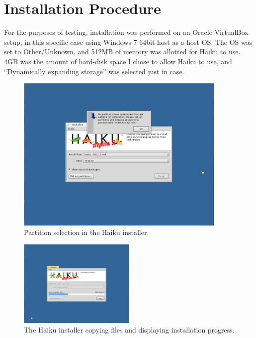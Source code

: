 \documentclass{article}
\begin{document}
\section{Installation Procedure}

For the purposes of testing, installation was performed on an Oracle
VirtualBox setup, in this specific case using Windows 7 64bit host as
a host OS.  The OS was set to Other/Unknown, and 512MB of memory was
allotted for Haiku to use. 4GB was the amount of hard-disk space I
chose to allow Haiku to use, and ``Dynamically expanding storage'' was
selected just in case.

\begin{figure}[h]
\centering
\includegraphics[width=0.9\textwidth]{figs/install-partition.png}
\caption{Partition selection in the Haiku installer.}
\label{fig:install-partition}
\end{figure}

\begin{figure}[h]
\centering
\includegraphics[width=0.5\textwidth]{figs/install-progress.png}
\caption{The Haiku installer copying files and displaying installation
  progress.}
\label{fig:install-progress}
\end{figure}
\end{document}
